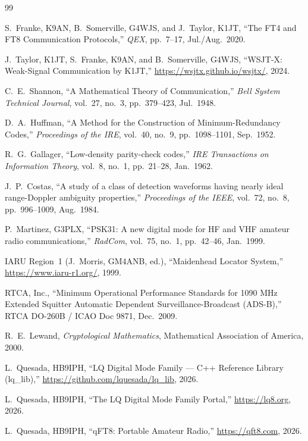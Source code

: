 \begin{thebibliography}{99}
\fontsize{7.6pt}{8.8pt}\selectfont
\raggedright
{}
\setlength{\itemsep}{2.2pt plus 0.6pt minus 0.4pt}
\setlength{\parskip}{0pt}
\setlength{\parsep}{0pt}
  S.~Franke, K9AN, B.~Somerville, G4WJS, and J.~Taylor, K1JT,
  ``The FT4 and FT8 Communication Protocols,''
  \textit{QEX}, pp.~7--17, Jul./Aug.\ 2020.

  J.~Taylor, K1JT, S.~Franke, K9AN, and B.~Somerville, G4WJS,
  ``WSJT-X: Weak-Signal Communication by K1JT,''
  \mbox{\url{https://wsjtx.github.io/wsjtx/}}, 2024.

  C.~E.~Shannon,
  ``A Mathematical Theory of Communication,''
  \textit{Bell System Technical Journal}, vol.~27, no.~3,
  pp.~379--423, Jul.\ 1948.

  D.~A.~Huffman,
  ``A Method for the Construction of Minimum-Redundancy Codes,''
  \textit{Proceedings of the IRE}, vol.~40, no.~9,
  pp.~1098--1101, Sep.\ 1952.

  R.~G.~Gallager,
  ``Low-density parity-check codes,''
  \textit{IRE Transactions on Information Theory}, vol.~8, no.~1,
  pp.~21--28, Jan.\ 1962.

  J.~P.~Costas,
  ``A study of a class of detection waveforms having nearly ideal range-Doppler ambiguity properties,''
  \textit{Proceedings of the IEEE}, vol.~72, no.~8,
  pp.~996--1009, Aug.\ 1984.

  P.~Martinez, G3PLX,
  ``PSK31: A new digital mode for HF and VHF amateur radio communications,''
  \textit{RadCom}, vol.~75, no.~1, pp.~42--46, Jan.\ 1999.

  IARU Region~1 (J.~Morris, GM4ANB, ed.),
  ``Maidenhead Locator System,''
  \mbox{\url{https://www.iaru-r1.org/}}, 1999.

  RTCA, Inc.,
  ``Minimum Operational Performance Standards for 1090 MHz Extended Squitter Automatic Dependent Surveillance-Broadcast (ADS-B),''
  RTCA DO-260B / ICAO Doc 9871, Dec.\ 2009.

  R.~E.~Lewand,
  \textit{Cryptological Mathematics},
  Mathematical Association of America, 2000.

  L.~Quesada, HB9IPH,
  ``LQ Digital Mode Family --- C++ Reference Library (lq\_lib),''
  \mbox{\url{https://github.com/lquesada/lq_lib}}, 2026.

  L.~Quesada, HB9IPH,
  ``The LQ Digital Mode Family Portal,''
  \mbox{\url{https://lq8.org}}, 2026.

  L.~Quesada, HB9IPH,
  ``qFT8: Portable Amateur Radio,''
  \mbox{\url{https://qft8.com}}, 2026.
\end{thebibliography}
